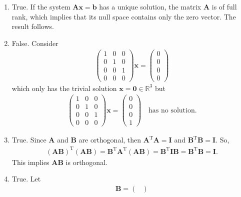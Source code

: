 \documentclass[12pt]{article}
\begin{document}
\begin{enumerate}[label=\textbf{(\alph*)}]
    \itemsep 0em
    \item True. If the system $\mathbf{Ax}=\mathbf{b}$ has a unique solution, the matrix $\mathbf{A}$ is of full rank, which implies that its null space contains only the zero vector. The result follows.
    \item False. Consider \begin{align*}
        \begin{pmatrix}
            1 & 0 & 0 \\ 0 & 1 & 0 \\ 0 & 0 & 1 \\ 0 & 0 & 0
        \end{pmatrix}\mathbf{x}=\begin{pmatrix}
            0\\0\\0\\0
        \end{pmatrix}
    \end{align*}
    which only has the trivial solution $\mathbf{x}=\mathbf{0}\in\mathbb{R}^3$ but \begin{align*}
        \begin{pmatrix}
            1 & 0 & 0 \\ 0 & 1 & 0 \\ 0 & 0 & 1 \\ 0 & 0 & 0
        \end{pmatrix}\mathbf{x}=\begin{pmatrix}
            0\\0\\0\\1
        \end{pmatrix}\quad\text{has no solution}.
    \end{align*}
    \item True. Since $\mathbf{A}$ and $\mathbf{B}$ are orthogonal, then $\mathbf{A}^\text{T}\mathbf{A}=\mathbf{I}$ and $\mathbf{B}^\text{T}\mathbf{B}=\mathbf{I}$. So, \begin{align*}
        \left(\mathbf{AB}\right)^\text{T}\left(\mathbf{AB}\right)=\mathbf{B}^\text{T}\mathbf{A}^\text{T}\left(\mathbf{AB}\right)=\mathbf{B}^\text{T}\mathbf{IB}=\mathbf{B}^\text{T}\mathbf{B}=\mathbf{I}.
    \end{align*}
    This implies $\mathbf{AB}$ is orthogonal.
    \item True. Let \begin{align*}
        \mathbf{B}=\begin{pmatrix}

\end{pmatrix}
\end{align*}
\end{enumerate}
\end{document}
